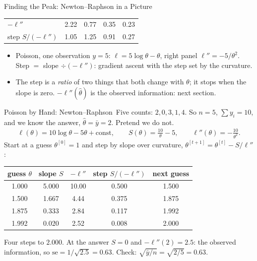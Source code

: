 \documentclass[aspectratio=169,11pt,xcolor=dvipsnames]{beamer}
\newcommand{\loglik}{\ell}
\newcommand{\SE}{\mathrm{se}}
\newcommand{\core}{\,\raisebox{0.6pt}{\textcolor{corestar}{$\bigstar$}}}
\begin{document}
\begin{frame}{Finding the Peak: Newton--Raphson in a Picture}
\begin{center}
\begin{tabular}{lcccc}
$-\loglik''$ & 2.22 & 0.77 & 0.35 & 0.23 \\
step $S/(-\loglik'')$ & 1.05 & 1.25 & 0.91 & 0.27 \\
\bottomrule
\end{tabular}
\end{center}
\vskip-1pt
\begin{itemize}\itemsep0pt
  \item Poisson, one observation $y = 5$: $\loglik = 5\log\theta - \theta$,
        right panel $\loglik'' = -5/\theta^{2}$. Step $=$ slope
        $\div (-\loglik'')$: gradient ascent with the step set by the curvature.
  \item The step is a \emph{ratio} of two things that both change with
        $\theta$; it stops when the slope is zero. $-\loglik''(\hat\theta)$
        is the observed information: next section.
\end{itemize}
\end{frame}

\begin{frame}{Poisson by Hand: Newton--Raphson\core}
Five counts: $2, 0, 3, 1, 4$. So $n = 5$, $\sum y_i = 10$, and we know the
answer, $\hat\theta = \bar y = 2$. Pretend we do not.
\begingroup\setlength{\abovedisplayskip}{2pt}\setlength{\belowdisplayskip}{2pt}
\begin{align*}
  \loglik(\theta) = 10\log\theta - 5\theta + \text{const},
  \qquad
  S(\theta) = \frac{10}{\theta} - 5,
  \qquad
  \loglik''(\theta) = -\frac{10}{\theta^{2}} .
\end{align*}
\endgroup
Start at a guess $\theta^{[0]} = 1$ and step by slope over curvature,
$\theta^{[t+1]} = \theta^{[t]} - S/\loglik''$:
\begin{center}
\renewcommand{\arraystretch}{1.1}
\begin{tabular}{ccccc}
\toprule
guess $\theta$ & slope $S$ & $-\loglik''$ & step $S/(-\loglik'')$ & next guess \\
\midrule
1.000 & 5.000 & 10.00 & 0.500 & 1.500 \\
1.500 & 1.667 & 4.44  & 0.375 & 1.875 \\
1.875 & 0.333 & 2.84  & 0.117 & 1.992 \\
1.992 & 0.020 & 2.52  & 0.008 & 2.000 \\
\bottomrule
\end{tabular}
\end{center}
\vskip2pt
Four steps to $2.000$. At the answer $S = 0$ and $-\loglik''(2) = 2.5$: the
observed information, so $\SE = 1/\sqrt{2.5} = 0.63$. Check:
$\sqrt{\bar y/n} = \sqrt{2/5} = 0.63$.
\end{frame}
\end{document}
